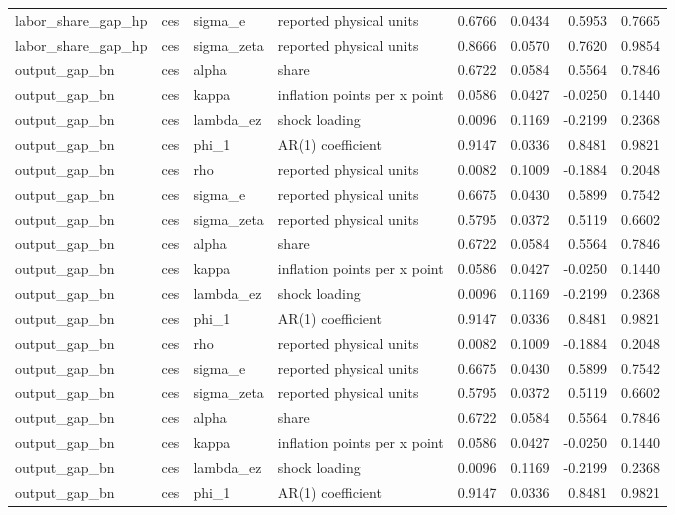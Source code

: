 \begin{tabular}{llllrrrr}
labor\_share\_gap\_hp & ces & sigma\_e & reported physical units & 0.6766 & 0.0434 & 0.5953 & 0.7665 \\
labor\_share\_gap\_hp & ces & sigma\_zeta & reported physical units & 0.8666 & 0.0570 & 0.7620 & 0.9854 \\
output\_gap\_bn & ces & alpha & share & 0.6722 & 0.0584 & 0.5564 & 0.7846 \\
output\_gap\_bn & ces & kappa & inflation points per x point & 0.0586 & 0.0427 & -0.0250 & 0.1440 \\
output\_gap\_bn & ces & lambda\_ez & shock loading & 0.0096 & 0.1169 & -0.2199 & 0.2368 \\
output\_gap\_bn & ces & phi\_1 & AR(1) coefficient & 0.9147 & 0.0336 & 0.8481 & 0.9821 \\
output\_gap\_bn & ces & rho & reported physical units & 0.0082 & 0.1009 & -0.1884 & 0.2048 \\
output\_gap\_bn & ces & sigma\_e & reported physical units & 0.6675 & 0.0430 & 0.5899 & 0.7542 \\
output\_gap\_bn & ces & sigma\_zeta & reported physical units & 0.5795 & 0.0372 & 0.5119 & 0.6602 \\
output\_gap\_bn & ces & alpha & share & 0.6722 & 0.0584 & 0.5564 & 0.7846 \\
output\_gap\_bn & ces & kappa & inflation points per x point & 0.0586 & 0.0427 & -0.0250 & 0.1440 \\
output\_gap\_bn & ces & lambda\_ez & shock loading & 0.0096 & 0.1169 & -0.2199 & 0.2368 \\
output\_gap\_bn & ces & phi\_1 & AR(1) coefficient & 0.9147 & 0.0336 & 0.8481 & 0.9821 \\
output\_gap\_bn & ces & rho & reported physical units & 0.0082 & 0.1009 & -0.1884 & 0.2048 \\
output\_gap\_bn & ces & sigma\_e & reported physical units & 0.6675 & 0.0430 & 0.5899 & 0.7542 \\
output\_gap\_bn & ces & sigma\_zeta & reported physical units & 0.5795 & 0.0372 & 0.5119 & 0.6602 \\
output\_gap\_bn & ces & alpha & share & 0.6722 & 0.0584 & 0.5564 & 0.7846 \\
output\_gap\_bn & ces & kappa & inflation points per x point & 0.0586 & 0.0427 & -0.0250 & 0.1440 \\
output\_gap\_bn & ces & lambda\_ez & shock loading & 0.0096 & 0.1169 & -0.2199 & 0.2368 \\
output\_gap\_bn & ces & phi\_1 & AR(1) coefficient & 0.9147 & 0.0336 & 0.8481 & 0.9821 \\

\end{tabular}
